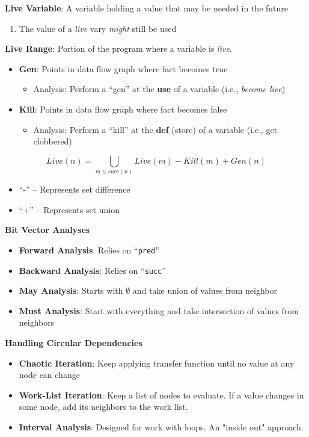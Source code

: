 \documentclass[10pt,twocolumn]{report}
\newcommand{\red}[1]{{\color{red} #1}}
\newcommand{\green}[1]{{\color{green} #1}}
\begin{document}
\textbf{Live Variable}: A variable holding a value that may be needed in the future
\begin{enumerate}
  \item The value of a \emph{live} vary \emph{might} still be used
\end{enumerate}

\textbf{Live Range}: Portion of the program where a variable is \textit{live}.

\begin{itemize}
  \item \textbf{Gen}: Points in data flow graph where fact becomes \green{true}
    \begin{itemize}
      \item Analysis: Perform a ``gen'' at the \textbf{use} of a variable (i.e., \textit{become live})
    \end{itemize}
  \item \textbf{Kill}: Points in data flow graph where fact becomes \red{false}
    \begin{itemize}
      \item Analysis: Perform a ``kill'' at the \textbf{def} (store) of a variable  (i.e., get clobbered)
    \end{itemize}
\end{itemize}

\begin{equation}
  Live(n) = \bigcup_{m\in succ(n)}Live(m) - Kill(m) + Gen(n)
\end{equation}
\begin{itemize}
  \item ``-'' -- Represents set difference
  \item ``+'' -- Represents set union
\end{itemize}

\textbf{Bit Vector Analyses}
\begin{itemize}
  \item \textbf{Forward Analysis}: Relies on ``\texttt{pred}''
  \item \textbf{Backward Analysis}: Relies on ``\texttt{succ}''
  \item \textbf{May Analysis}: Starts with $\emptyset$ and take union of values from neighbor
  \item \textbf{Must Analysis}: Start with everything and take intersection of values from neighbors
\end{itemize}

\textbf{Handling Circular Dependencies}
\begin{itemize}
  \item \textbf{Chaotic Iteration}: Keep applying transfer function until no value at any node can change
  \item \textbf{Work-List Iteration}: Keep a list of nodes to evaluate. If a value changes in some node, add its neighbors to the work list.
  \item \textbf{Interval Analysis}: Designed for work with loops. An "inside out" approach.
\end{itemize}
\end{document}
